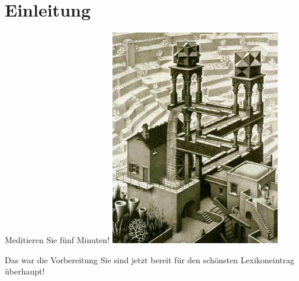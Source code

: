 \section{Einleitung}

\begin{frame}
  {Meditieren Sie fünf Minuten!}
  \onslide<+->
  \onslide<+->
  \centering 
  \includegraphics[height=0.7\textheight]{graphics/escher_low}\\
\end{frame}

\begin{frame}
  {Das war die Vorbereitung}
  \onslide<+->
  \onslide<+->
  \centering 
  Sie sind jetzt bereit für den schönsten Lexikoneintrag überhaupt!\\
  \Doppelzeile
  \onslide<+->
\end{frame}



